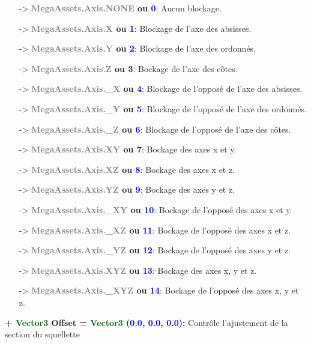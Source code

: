 \documentclass[a4paper, 11pt]{article}
\begin{document}
	\begin{itemize}
		\item [-> \textbf{\textcolor{gray}{MegaAssets.Axis.NONE} ou \textcolor{blue}{0}}:] Aucun blockage.
		\item [-> \textbf{\textcolor{gray}{MegaAssets.Axis.X} ou \textcolor{blue}{1}}:] Blockage de l'axe 
		des absisses.
		\item [-> \textbf{\textcolor{gray}{MegaAssets.Axis.Y} ou \textcolor{blue}{2}}:] Blockage de l'axe 
		des ordonnés.
		\item [-> \textbf{\textcolor{gray}{MegaAssets.Axis.Z} ou \textcolor{blue}{3}}:] Bockage de l'axe des 
		côtes.
		\item [-> \textbf{\textcolor{gray}{MegaAssets.Axis.\_X} ou \textcolor{blue}{4}}:] Blockage de 
		l'opposé de l'axe des absisses.
		\item [-> \textbf{\textcolor{gray}{MegaAssets.Axis.\_Y} ou \textcolor{blue}{5}}:] Blockage de 
		l'opposé de l'axe des ordonnés.
		\item [-> \textbf{\textcolor{gray}{MegaAssets.Axis.\_Z} ou \textcolor{blue}{6}}:] Blockage de 
		l'opposé de l'axe des côtes.
		\item [-> \textbf{\textcolor{gray}{MegaAssets.Axis.XY} ou \textcolor{blue}{7}}:] Bockage des axes x 
		et y.
		\item [-> \textbf{\textcolor{gray}{MegaAssets.Axis.XZ} ou \textcolor{blue}{8}}:] Bockage des axes x 
		et z.
		\item [-> \textbf{\textcolor{gray}{MegaAssets.Axis.YZ} ou \textcolor{blue}{9}}:] Bockage des axes y 
		et z.
		\item [-> \textbf{\textcolor{gray}{MegaAssets.Axis.\_XY} ou \textcolor{blue}{10}}:] Bockage de 
		l'opposé des axes x et y.
		\item [-> \textbf{\textcolor{gray}{MegaAssets.Axis.\_XZ} ou \textcolor{blue}{11}}:] Bockage de 
		l'opposé des axes x et z.
		\item [-> \textbf{\textcolor{gray}{MegaAssets.Axis.\_YZ} ou \textcolor{blue}{12}}:] Bockage de 
		l'opposé des axes y et z.		
		\item [-> \textbf{\textcolor{gray}{MegaAssets.Axis.XYZ} ou \textcolor{blue}{13}}:] Bockage des axes 
		x, y et z.
		\item [-> \textbf{\textcolor{gray}{MegaAssets.Axis.\_XYZ} ou \textcolor{blue}{14}}:] Bockage de 
		l'opposé des axes x, y et z.\\
	\end{itemize}
	\textbf{+ \textcolor{darkgreen}{Vector3} Offset = \textcolor{darkgreen}{Vector3} (\textcolor{blue}{0.0}, 
	\textcolor{blue}{0.0}, \textcolor{blue}{0.0}):} Contrôle l'ajustement de la section du squellette 
\end{document}
